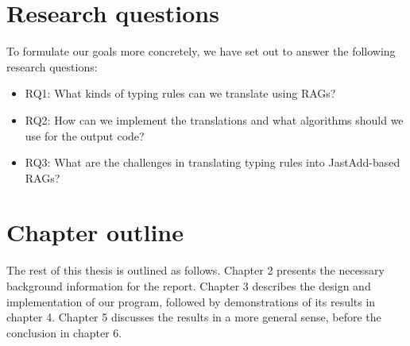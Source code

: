\documentclass[nofilelist]{cslthse-msc}
\newcommand{\CR}[1]{\textcolor{green!60!black}{[\textbf{CR}:#1]}}
\begin{document}
\section{Research questions}
To formulate our goals more concretely, we have set out to answer the following research questions:
\newcommand{\rqone}{RQ1: What kinds of typing rules can we translate using RAGs?}
\newcommand{\rqtwo}{RQ2: How can we implement the translations and what algorithms should we use for the output code?}
\newcommand{\rqthree}{RQ3: What are the challenges in translating typing rules into JastAdd-based RAGs?}
\begin{itemize}
  \item \rqone
  \item \rqtwo
  \item \rqthree
\end{itemize}

\section{Chapter outline}
The rest of this thesis is outlined as follows.
Chapter 2 presents the necessary background information for the report.
Chapter 3 describes the design and implementation of our program, followed by demonstrations of its results in chapter 4.
Chapter 5 discusses the results in a more general sense, before the conclusion in chapter 6.
\end{document}
